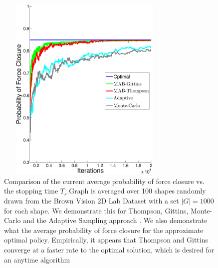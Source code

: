 \documentclass[a4paper, 10pt, conference]{ieeeconf}      %
\begin{document}
\begin{figure}[ht!]
\centering
\includegraphics[width = 8.5cm, height = 9cm]{matlab_figures/pfc.eps}
\caption{ \footnotesize Comparison of the current average probability of force closure vs. the stopping time $T_s$.Graph is averaged over 100 shapes randomly drawn from the Brown Vision 2D Lab Dataset \cite{brown} with a set $|G|=1000$ for each shape.  We demonstrate this for Thompson, Gittins, Monte-Carlo and the Adaptive Sampling approach \cite{kehoe2012toward}. We also demonstrate what the average probability of force closure for the approximate optimal policy. Empirically, it appears that Thompson and Gittins converge at a faster rate to the optimal solution, which is desired for an anytime algorithm  }
\vspace*{-10pt}
\label{fig:grasp_quality}
\end{figure}
\end{document}
